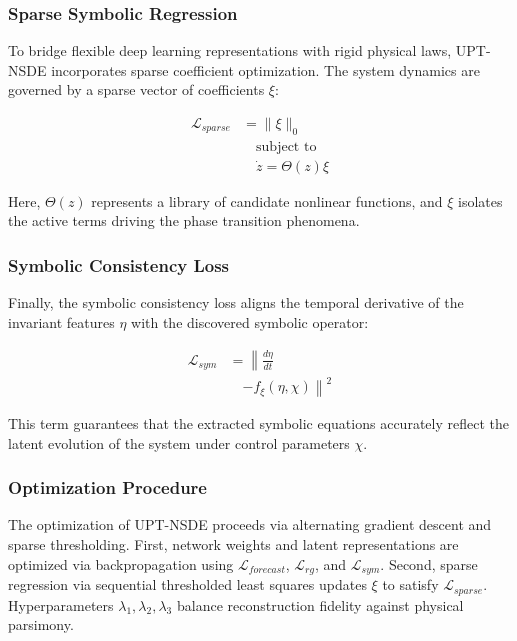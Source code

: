 \documentclass[10pt,twocolumn]{article}
\begin{document}
\subsubsection{Sparse Symbolic Regression}
To bridge flexible deep
learning representations
with rigid physical
laws, UPT-NSDE incorporates
sparse coefficient
optimization. The system
dynamics are governed
by a sparse vector of
coefficients $\xi$:

\begin{equation}
\begin{aligned}
\mathcal{L}_{sparse} &=
\| \xi \|_0 \\
&\quad \text{subject to} \\
&\quad \dot{z} = \Theta(z)\xi
\end{aligned}
\end{equation}

Here, $\Theta(z)$
represents a library
of candidate nonlinear
functions, and $\xi$
isolates the active
terms driving the phase
transition phenomena.

\subsubsection{Symbolic Consistency Loss}
Finally, the symbolic
consistency loss aligns
the temporal derivative
of the invariant features
$\eta$ with the discovered
symbolic operator:

\begin{equation}
\begin{aligned}
\mathcal{L}_{sym} &=
\left\| \frac{d \eta}{dt}
\right. \\
&\quad \left.
- f_{\xi}(\eta, \chi) \right\|^2
\end{aligned}
\end{equation}

This term guarantees
that the extracted
symbolic equations
accurately reflect the
latent evolution of
the system under
control parameters $\chi$.

\subsubsection{Optimization Procedure}
The optimization of
UPT-NSDE proceeds via
alternating gradient
descent and sparse
thresholding. First,
network weights and
latent representations
are optimized via
backpropagation using
$\mathcal{L}_{forecast}$,
$\mathcal{L}_{rg}$, and
$\mathcal{L}_{sym}$.
Second, sparse regression
via sequential thresholded
least squares updates
$\xi$ to satisfy
$\mathcal{L}_{sparse}$.
Hyperparameters
$\lambda_1, \lambda_2,
\lambda_3$ balance
reconstruction fidelity
against physical
parsimony.
\end{document}
